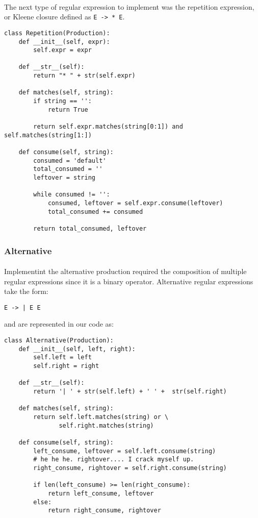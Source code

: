 \documentclass{article}
\begin{document}
\paragraph{} The next type of regular expression to implement was the 
repetition expression, or Kleene closure defined as \verb|E -> * E|. 

\begin{verbatim}
class Repetition(Production):
    def __init__(self, expr):
        self.expr = expr
    
    def __str__(self):
        return "* " + str(self.expr)

    def matches(self, string):
        if string == '':
            return True

        return self.expr.matches(string[0:1]) and self.matches(string[1:])
        
    def consume(self, string):
        consumed = 'default'
        total_consumed = ''
        leftover = string

        while consumed != '':
            consumed, leftover = self.expr.consume(leftover)
            total_consumed += consumed

        return total_consumed, leftover
\end{verbatim}

\subsubsection{Alternative}
\paragraph{} Implementint the alternative production required the composition 
of multiple regular expressions since it is a binary operator. Alternative
regular expressions take the form: 

\begin{verbatim}
E -> | E E
\end{verbatim}

and are represented in our code as:

\begin{verbatim}
class Alternative(Production):
    def __init__(self, left, right):
        self.left = left
        self.right = right

    def __str__(self):
        return '| ' + str(self.left) + ' ' +  str(self.right)

    def matches(self, string):
        return self.left.matches(string) or \
               self.right.matches(string)

    def consume(self, string):
        left_consume, leftover = self.left.consume(string)
        # he he he. rightover.... I crack myself up.
        right_consume, rightover = self.right.consume(string)

        if len(left_consume) >= len(right_consume):
            return left_consume, leftover
        else:
            return right_consume, rightover

\end{verbatim}
\end{document}
